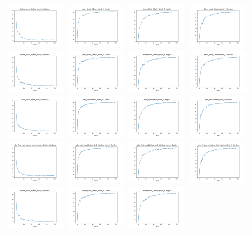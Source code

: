 \begin{longtable}{cccc}
\includegraphics[scale=0.2]{./images/mixup_position/before_block_0;before_block_2_ValidLoss.png} & \includegraphics[scale=0.2]{./images/mixup_position/before_block_0;before_block_2_CharAcc.png} & \includegraphics[scale=0.2]{./images/mixup_position/before_block_0;before_block_2_FragAcc.png} & \includegraphics[scale=0.2]{./images/mixup_position/before_block_0;before_block_2_WordAcc.png}\\
\includegraphics[scale=0.2]{./images/mixup_position/before_block_1;before_block_4_ValidLoss.png} & \includegraphics[scale=0.2]{./images/mixup_position/before_block_1;before_block_4_CharAcc.png} & \includegraphics[scale=0.2]{./images/mixup_position/before_block_1;before_block_4_FragAcc.png} & \includegraphics[scale=0.2]{./images/mixup_position/before_block_1;before_block_4_WordAcc.png}\\
\includegraphics[scale=0.2]{./images/mixup_position/after_blocks;before_block_0_ValidLoss.png} & \includegraphics[scale=0.2]{./images/mixup_position/after_blocks;before_block_0_CharAcc.png} & \includegraphics[scale=0.2]{./images/mixup_position/after_blocks;before_block_0_FragAcc.png} & \includegraphics[scale=0.2]{./images/mixup_position/after_blocks;before_block_0_WordAcc.png}\\
\includegraphics[scale=0.2]{./images/mixup_position/after_final_conv1;before_block_1;before_block_4_ValidLoss.png} & \includegraphics[scale=0.2]{./images/mixup_position/after_final_conv1;before_block_1;before_block_4_CharAcc.png} & \includegraphics[scale=0.2]{./images/mixup_position/after_final_conv1;before_block_1;before_block_4_FragAcc.png} & \includegraphics[scale=0.2]{./images/mixup_position/after_final_conv1;before_block_1;before_block_4_WordAcc.png}\\
\includegraphics[scale=0.2]{./images/mixup_position/before_block_0;before_block_4_ValidLoss.png} & \includegraphics[scale=0.2]{./images/mixup_position/before_block_0;before_block_4_CharAcc.png} & \includegraphics[scale=0.2]{./images/mixup_position/before_block_0;before_block_4_FragAcc.png} & 
\end{longtable}
